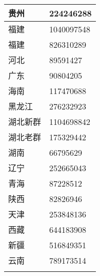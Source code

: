 {\begin{tabular}[t]{|w{c}{4em}|w{c}{6em}|}
        \hline
        贵州   & 224246288                 \\
        \hline
        福建   & 1040097548                \\
        \hline
        福建   & 826310289                 \\
        \hline
        河北   & 89591427                  \\
        \hline
        广东   & 90804205                  \\
        \hline
        海南   & 117470688                 \\
        \hline
        黑龙江  & 276232923                 \\
        \hline
        湖北新群 & 1104698842                \\
        \hline
        湖北老群 & 175329442                 \\
        \hline
        湖南   & 66795629                  \\
        \hline
        辽宁   & 252665043                 \\
        \hline
        青海   & 87228512                  \\
        \hline
        陕西   & 82826946                  \\
        \hline
        天津   & 253848136                 \\
        \hline
        西藏   & 644183908                 \\
        \hline
        新疆   & 516849351                 \\
        \hline
        云南   & 789173514                 \\
        \Xhline{1.2pt}
    \end{tabular}%
}

\newpage